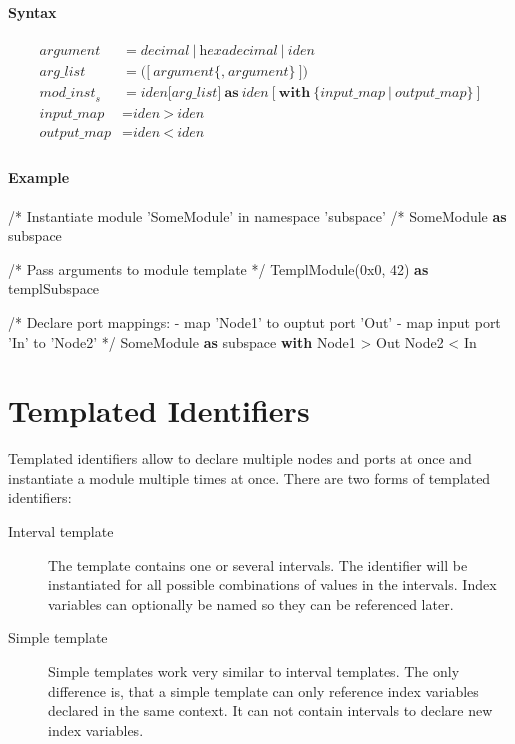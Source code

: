 \documentclass[a4paper,11pt,twoside]{report}
\begin{document}
{{{\paragraph{Syntax}
\begin{align*}
    \textit{argument} & \mathop{=}
        \textit{decimal}\ |\ \textit{hexadecimal}\ |\ \textit{iden}\\
    \textit{arg\_list} & \mathop{=}
        \textbf{(}\big[\ 
            \textit{argument}\big\{\textbf{,}\ \textit{argument}\big\}\ 
        \big] \textbf{)}\\
    \textit{mod\_inst}_s & \mathop{=}
        \textit{iden} \big[\textit{arg\_list}\big]\ \textbf{as}\ \textit{iden}\ \big[\ 
            \textbf{with}\ \big\{\textit{input\_map}\ |\ \textit{output\_map}\big\}\ 
        \big]\\
    \textit{input\_map} & \mathop{=}
        \textit{iden}\ \textbf{>}\ \textit{iden}\\
    \textit{output\_map} & \mathop{=}
        \textit{iden}\ \textbf{<}\ \textit{iden}\\
\end{align*}

\clearpage
\paragraph{Example}
\begin{syntax}
    /* Instantiate module 'SomeModule' in namespace 'subspace' /*
    SomeModule \textbf{as} subspace

    /* Pass arguments to module template */
    TemplModule(0x0, 42) \textbf{as} templSubspace

    /* Declare port mappings:
       - map 'Node1' to ouptut port 'Out'
       - map input port 'In' to 'Node2' */
    SomeModule \textbf{as} subspace \textbf{with}
        Node1 > Out
        Node2 < In
\end{syntax}

\section{Templated Identifiers}
\label{sec:template_idens}
Templated identifiers allow to declare multiple nodes and ports at once and instantiate a module multiple times at once.
There are two forms of templated identifiers:
\begin{description}
    \item[Interval template]
        The template contains one or several intervals.
        The identifier will be instantiated for all possible combinations of values in the intervals.
        Index variables can optionally be named so they can be referenced later.
    \item[Simple template]
        Simple templates work very similar to interval templates.
        The only difference is, that a simple template can only reference index variables declared in the same context.
        It can not contain intervals to declare new index variables.
\end{description}

}}}
\end{document}
